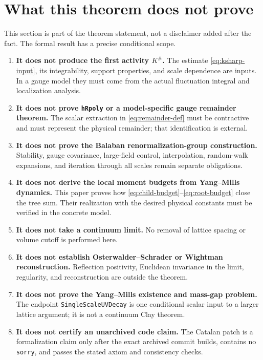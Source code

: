 \documentclass[11pt,a4paper]{article}
\theoremstyle{definition}
\newcommand{\Ksharp}{K^{\#}}
\begin{document}
\section{What this theorem does not prove}
\label{sec:not-prove}

This section is part of the theorem statement, not a disclaimer added after the fact.
The formal result has a precise conditional scope.

\begin{enumerate}
\item \textbf{It does not produce the first activity $\Ksharp$.}
      The estimate \eqref{eq:ksharp-input}, its integrability, support properties, and
      scale dependence are inputs.  In a gauge model they must come from the actual
      fluctuation integral and localization analysis.
\item \textbf{It does not prove \texttt{hRpoly} or a model-specific gauge remainder
      theorem.}  The scalar extraction in \eqref{eq:remainder-def} must be contractive
      and must represent the physical remainder; that identification is external.
\item \textbf{It does not prove the Balaban renormalization-group construction.}
      Stability, gauge covariance, large-field control, interpolation, random-walk
      expansions, and iteration through all scales remain separate obligations.
\item \textbf{It does not derive the local moment budgets from Yang--Mills dynamics.}
      This paper proves how \eqref{eq:child-budget}--\eqref{eq:root-budget} close the tree
      sum.  Their realization with the desired physical constants must be verified in
      the concrete model.
\item \textbf{It does not take a continuum limit.}  No removal of lattice spacing or
      volume cutoff is performed here.
\item \textbf{It does not establish Osterwalder--Schrader or Wightman reconstruction.}
      Reflection positivity, Euclidean invariance in the limit, regularity, and
      reconstruction are outside the theorem.
\item \textbf{It does not prove the Yang--Mills existence and mass-gap problem.}
      The endpoint \texttt{SingleScaleUVDecay} is one conditional scalar input to a
      larger lattice argument; it is not a continuum Clay theorem.
\item \textbf{It does not certify an unarchived code claim.}  The Catalan patch is a
      formalization claim only after the exact archived commit builds, contains no
      \texttt{sorry}, and passes the stated axiom and consistency checks.
\end{enumerate}
\end{document}
